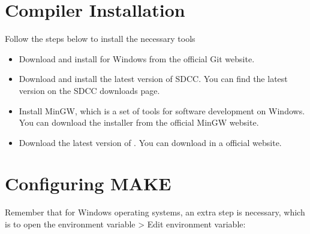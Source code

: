 \documentclass[letterpaper,10pt,english]{sphinxmanual}
\begin{document}
\section{Compiler Installation}
\label{\detokenize{install_windows:compiler-installation}}
\sphinxAtStartPar
Follow the steps below to install the necessary tools
\begin{itemize}
\item {} \begin{description}
\sphinxAtStartPar
Download and install  for Windows from the official Git website.

\end{description}

\item {} \begin{description}
\sphinxAtStartPar
Download and install the latest version of SDCC. You can find the latest version on the SDCC downloads page.

\end{description}

\item {} \begin{description}
\sphinxAtStartPar
Install MinGW, which is a set of tools for software development on Windows. You can download the installer from the official MinGW website.

\end{description}

\item {} \begin{description}
\sphinxAtStartPar
Download the latest version of . You can download in a official website.

\end{description}

\end{itemize}


\section{Configuring MAKE}
\label{\detokenize{install_windows:configuring-make}}
\sphinxAtStartPar
Remember that for Windows operating systems, an extra step is necessary, which is to open the environment variable \sphinxhyphen{}\textgreater{} Edit environment variable:
\end{document}
